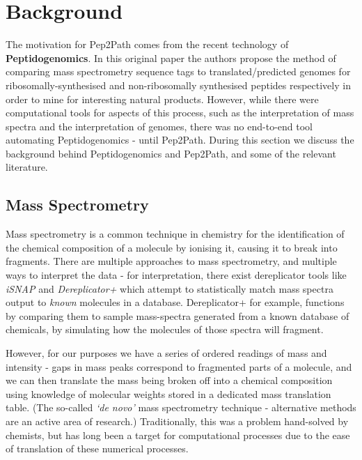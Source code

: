 \documentclass{l4proj}
\newcommand{\cit}[1]{\citep{#1}}
\begin{document}
\chapter{Background}

The motivation for Pep2Path comes from the recent technology of \textbf{Peptidogenomics}. \cit{peptidogenomics} In this original paper the authors propose the method of comparing mass spectrometry sequence tags to translated/predicted genomes for ribosomally-synthesised and non-ribosomally synthesised peptides respectively in order to mine for interesting natural products. However, while there were computational tools for aspects of this process, such as the interpretation of mass spectra and the interpretation of genomes, there was no end-to-end tool automating Peptidogenomics - until Pep2Path. During this section we discuss the background behind Peptidogenomics and Pep2Path, and some of the relevant literature.

\section{Mass Spectrometry}

Mass spectrometry is a common technique in chemistry for the identification of the chemical composition of a molecule by ionising it, causing it to break into fragments. There are multiple approaches to mass spectrometry, and multiple ways to interpret the data - for interpretation, there exist dereplicator tools like \textit{iSNAP} \cit{isnap} and \textit{Dereplicator+} \cit{derep+} which attempt to statistically match mass spectra output to \textit{known} molecules in a database. Dereplicator+ for example, functions by comparing them to sample mass-spectra generated from a known database of chemicals, by simulating how the molecules of those spectra will fragment. 

However, for our purposes we have a series of ordered readings of mass and intensity - gaps in mass peaks correspond to fragmented parts of a molecule, and we can then translate the mass being broken off into a chemical composition using knowledge of molecular weights stored in a dedicated mass translation table. (The so-called \textit{`de novo'} mass spectrometry technique - alternative methods are an active area of research.) Traditionally, this was a problem hand-solved by chemists, but has long been a target for computational processes due to the ease of translation of these numerical processes. 
\end{document}
